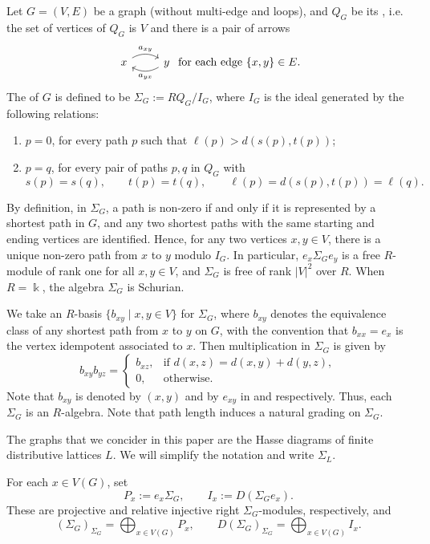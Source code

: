 \documentclass[a4paper,leqno]{amsart}
\begin{document}
\begin{dfn}
Let $G=(V,E)$ be a graph (without multi-edge and loops), and $Q_G$ be its , i.e. the set of vertices of $Q_G$ is $V$ and there is a pair of arrows
\[\begin{tikzcd}
	x \arrow[r, "{a_{xy}}", bend left] & y \arrow[l, "{a_{yx}}", bend left]
\end{tikzcd} \text{ for each edge }\{x,y\}\in E.\]
The  of $G$ is defined to be $\Sigma_G:=R Q_G/I_G$, where $I_G$ is the ideal generated by the following relations:
\begin{enumerate}
\item $p=0$, for every path $p$ such that $\ell(p)>d(s(p),t(p))$;
\item $p=q$, for every pair of paths $p,q$ in $Q_G$ with
$$s(p)=s(q),\qquad t(p)=t(q),\qquad
\ell(p)=d(s(p),t(p))=\ell(q).$$
\end{enumerate}
\end{dfn}

By definition, in $\Sigma_G$, a path is non-zero if and only if it is represented by a shortest path in $G$, and any two shortest paths with the same starting and ending vertices are identified. Hence, for any two vertices $x,y\in V$, there is a unique non-zero path from $x$ to $y$ modulo $I_G$. In particular, $e_x\Sigma_Ge_y$ is a free $R$-module of rank one for all $x,y\in V$, and $\Sigma_G$ is free of rank $|V|^2$ over $R$. When $R=\Bbbk$, the algebra $\Sigma_G$ is Schurian.

We take an $R$-basis $\{b_{xy}\mid x,y\in V\}$ for $\Sigma_G$, where $b_{xy}$ denotes the equivalence class of any shortest path from $x$ to $y$ on $G$, with the convention that $b_{xx}=e_x$ is the vertex idempotent associated to $x$. Then multiplication in $\Sigma_G$ is given by
$$
b_{xy}b_{yz}=
\begin{cases}
b_{xz}, & \text{if } d(x,z)=d(x,y)+d(y,z),\\
0, & \text{otherwise}.
\end{cases}
$$
Note that $b_{xy}$ is denoted by $(x,y)$ and by $e_{xy}$ in \cite{AI24} and \cite{AW24} respectively. Thus, each $\Sigma_G$ is an $R$-algebra.
Note that path length induces a natural grading on $\Sigma_G$. 

The graphs that we concider in this paper are the Hasse diagrams of finite distributive lattices $L$.  We will simplify the notation and write $\Sigma_L$.



For each $x\in V(G)$, set
\[
 P_x:=e_x\Sigma_G,
 \qquad
 I_x:=D(\Sigma_G e_x).
\]
These are projective and relative injective right $\Sigma_G$-modules, respectively, and
\[
 (\Sigma_G)_{\Sigma_G}=\bigoplus_{x\in V(G)}P_x,
 \qquad
 D(\Sigma_G)_{\Sigma_G}=\bigoplus_{x\in V(G)}I_x.
\]
\end{document}
